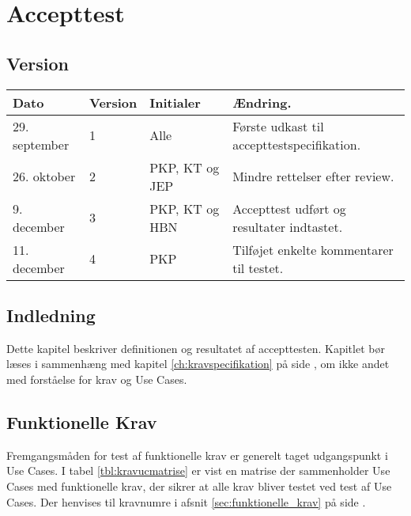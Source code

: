 \chapter{Accepttest} \label{ch:Accepttest}
\section*{Version}
\begin{table}[h]
	\centering
	\begin{tabularx}{\textwidth - 2cm}{|l|l|l|X|}
	\hline
	Dato			& Version			& Initialer 		& Ændring.									\\ \hline
	29. september 	& 1 				& Alle				& Første udkast til accepttestspecifikation.\\ \hline
	26. oktober		& 2 				& PKP, KT og JEP	& Mindre rettelser efter review.			\\ \hline
	9. december		& 3 				& PKP, KT og HBN	& Accepttest udført og resultater indtastet.\\ \hline
	11. december	& 4 				& PKP 				& Tilføjet enkelte kommentarer til testet.	\\ \hline
	\end{tabularx}
\end{table}

\section*{Indledning}

Dette kapitel beskriver definitionen og resultatet af accepttesten.
Kapitlet bør læses i sammenhæng med kapitel \ref{ch:kravspecifikation}  på side \pageref{ch:kravspecifikation}, om ikke andet med forståelse for krav og Use Cases.

\clearpage

\section{Funktionelle Krav}

Fremgangsmåden for test af funktionelle krav er generelt taget udgangspunkt i Use Cases. I tabel \ref{tbl:kravucmatrise} er vist en matrise der sammenholder Use Cases med funktionelle krav, der sikrer at alle krav bliver testet ved test af Use Cases. Der henvises til kravnumre i afsnit \ref{sec:funktionelle_krav} på side \pageref{sec:funktionelle_krav}.

